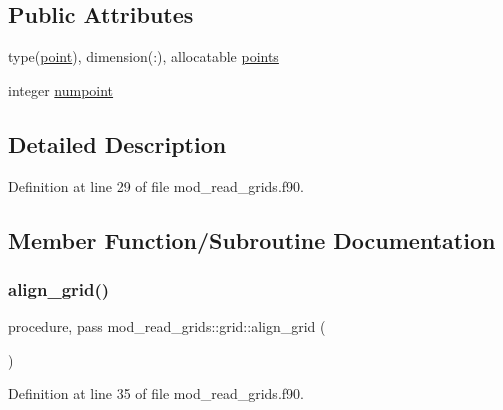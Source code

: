 \subsection*{Public Attributes}
\begin{DoxyCompactItemize}
\item 
type(\hyperlink{structmod__read__grids_1_1point}{point}), dimension(\+:), allocatable \hyperlink{structmod__read__grids_1_1grid_aa276c61a9bfda811d98102170e4bfeaf}{points}
\item 
integer \hyperlink{structmod__read__grids_1_1grid_a71e57f105913758d04222ff4a0a33c5e}{numpoint}
\end{DoxyCompactItemize}


\subsection{Detailed Description}


Definition at line 29 of file mod\+\_\+read\+\_\+grids.\+f90.



\subsection{Member Function/\+Subroutine Documentation}
\mbox{\label{structmod__read__grids_1_1grid_afe8bf79de342fe127c59a0a009b68c70}} 
\subsubsection{\texorpdfstring{align\+\_\+grid()}{align\_grid()}}
{\footnotesize\ttfamily procedure, pass mod\+\_\+read\+\_\+grids\+::grid\+::align\+\_\+grid (\begin{DoxyParamCaption}{ }\end{DoxyParamCaption})}



Definition at line 35 of file mod\+\_\+read\+\_\+grids.\+f90.

\mbox{\label{structmod__read__grids_1_1grid_a69ca38e3cf27b26c27bdbdcb26bb1048}} 
